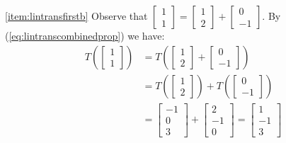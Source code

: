 \documentclass{ximera}
\begin{document}
\begin{example}
\begin{explanation}
\ref{item:lintransfirstb} Observe that $\begin{bmatrix}1\\1\end{bmatrix}=\begin{bmatrix}1\\2\end{bmatrix}+\begin{bmatrix}0\\-1\end{bmatrix}$.  By (\ref{eq:lintranscombinedprop}) we have:
\begin{align*}
    T\left(\begin{bmatrix}1\\1\end{bmatrix}\right)&=T\left(\begin{bmatrix}1\\2\end{bmatrix}+\begin{bmatrix}0\\-1\end{bmatrix}\right)\\
    &=T\left(\begin{bmatrix}1\\2\end{bmatrix}\right)+T\left(\begin{bmatrix}0\\-1\end{bmatrix}\right)\\
    &=\begin{bmatrix}-1\\0\\3\end{bmatrix}+\begin{bmatrix}2\\-1\\0\end{bmatrix}=\begin{bmatrix}1\\-1\\3\end{bmatrix}
\end{align*}
\end{explanation}
\end{example}
\end{document}
